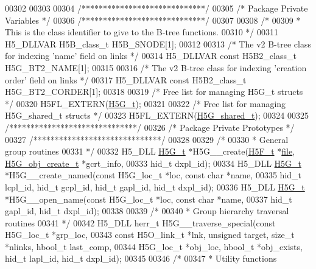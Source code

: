 \begin{DoxyCode}
00302 
00303 
00304 \textcolor{comment}{/*****************************/}
00305 \textcolor{comment}{/* Package Private Variables */}
00306 \textcolor{comment}{/*****************************/}
00307 
00308 \textcolor{comment}{/*}
00309 \textcolor{comment}{ * This is the class identifier to give to the B-tree functions.}
00310 \textcolor{comment}{ */}
00311 H5\_DLLVAR H5B\_class\_t H5B\_SNODE[1];
00312 
00313 \textcolor{comment}{/* The v2 B-tree class for indexing 'name' field on links */}
00314 H5\_DLLVAR \textcolor{keyword}{const} H5B2\_class\_t H5G\_BT2\_NAME[1];
00315 
00316 \textcolor{comment}{/* The v2 B-tree class for indexing 'creation order' field on links */}
00317 H5\_DLLVAR \textcolor{keyword}{const} H5B2\_class\_t H5G\_BT2\_CORDER[1];
00318 
00319 \textcolor{comment}{/* Free list for managing H5G\_t structs */}
00320 H5FL\_EXTERN(\hyperlink{struct_h5_g__t}{H5G\_t});
00321 
00322 \textcolor{comment}{/* Free list for managing H5G\_shared\_t structs */}
00323 H5FL\_EXTERN(\hyperlink{struct_h5_g__shared__t}{H5G\_shared\_t});
00324 
00325 \textcolor{comment}{/******************************/}
00326 \textcolor{comment}{/* Package Private Prototypes */}
00327 \textcolor{comment}{/******************************/}
00328 
00329 \textcolor{comment}{/*}
00330 \textcolor{comment}{ * General group routines}
00331 \textcolor{comment}{ */}
00332 H5\_DLL \hyperlink{struct_h5_g__t}{H5G\_t} *H5G\_\_create(\hyperlink{struct_h5_f__t}{H5F\_t} *\hyperlink{structfile}{file}, \hyperlink{struct_h5_g__obj__create__t}{H5G\_obj\_create\_t} *gcrt\_info,
00333     hid\_t dxpl\_id);
00334 H5\_DLL \hyperlink{struct_h5_g__t}{H5G\_t} *H5G\_\_create\_named(\textcolor{keyword}{const} H5G\_loc\_t *loc, \textcolor{keyword}{const} \textcolor{keywordtype}{char} *name,
00335     hid\_t lcpl\_id, hid\_t gcpl\_id, hid\_t gapl\_id, hid\_t dxpl\_id);
00336 H5\_DLL \hyperlink{struct_h5_g__t}{H5G\_t} *H5G\_\_open\_name(\textcolor{keyword}{const} H5G\_loc\_t *loc, \textcolor{keyword}{const} \textcolor{keywordtype}{char} *name,
00337     hid\_t gapl\_id, hid\_t dxpl\_id);
00338 
00339 \textcolor{comment}{/*}
00340 \textcolor{comment}{ * Group hierarchy traversal routines}
00341 \textcolor{comment}{ */}
00342 H5\_DLL herr\_t H5G\_\_traverse\_special(\textcolor{keyword}{const} H5G\_loc\_t *grp\_loc,
00343     \textcolor{keyword}{const} H5O\_link\_t *lnk, \textcolor{keywordtype}{unsigned} target, \textcolor{keywordtype}{size\_t} *nlinks, hbool\_t last\_comp,
00344     H5G\_loc\_t *obj\_loc, hbool\_t *obj\_exists, hid\_t lapl\_id, hid\_t dxpl\_id);
00345 
00346 \textcolor{comment}{/*}
00347 \textcolor{comment}{ * Utility functions}

\end{DoxyCode}
